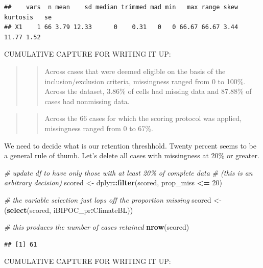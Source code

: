 \documentclass[
  11pt,
]{book}
\newenvironment{Shaded}{\begin{snugshade}}{\end{snugshade}}
\newcommand{\CommentTok}[1]{\textcolor[rgb]{0.37,0.37,0.37}{\textit{#1}}}
\newcommand{\DecValTok}[1]{\textcolor[rgb]{0.06,0.06,0.06}{#1}}
\newcommand{\FunctionTok}[1]{\textcolor[rgb]{0.27,0.27,0.27}{\textbf{#1}}}
\newcommand{\NormalTok}[1]{#1}
\newcommand{\OtherTok}[1]{\textcolor[rgb]{0.37,0.37,0.37}{#1}}
\newcommand{\SpecialCharTok}[1]{\textcolor[rgb]{0.43,0.43,0.43}{\textbf{#1}}}
\begin{document}
\begin{verbatim}
##    vars  n mean    sd median trimmed mad min   max range skew kurtosis   se
## X1    1 66 3.79 12.33      0    0.31   0   0 66.67 66.67 3.44    11.77 1.52
\end{verbatim}

CUMULATIVE CAPTURE FOR WRITING IT UP:

\begin{quote}
\begin{quote}
Across cases that were deemed eligible on the basis of the inclusion/exclusion criteria, missingness ranged from 0 to 100\%. Across the dataset, 3.86\% of cells had missing data and 87.88\% of cases had nonmissing data.
\end{quote}
\end{quote}

\begin{quote}
\begin{quote}
Across the 66 cases for which the scoring protocol was applied, missingness ranged from 0 to 67\%.
\end{quote}
\end{quote}

We need to decide what is our retention threshhold. Twenty percent seems to be a general rule of thumb. Let's delete all cases with missingness at 20\% or greater.

\begin{Shaded}
\begin{Highlighting}[]
\CommentTok{\# update df to have only those with at least 20\% of complete data}
\CommentTok{\# (this is an arbitrary decision)}
\NormalTok{scored }\OtherTok{\textless{}{-}}\NormalTok{ dplyr}\SpecialCharTok{::}\FunctionTok{filter}\NormalTok{(scored, prop\_miss }\SpecialCharTok{\textless{}=} \DecValTok{20}\NormalTok{)}

\CommentTok{\# the variable selection just lops off the proportion missing}
\NormalTok{scored }\OtherTok{\textless{}{-}}\NormalTok{ (}\FunctionTok{select}\NormalTok{(scored, iBIPOC\_pr}\SpecialCharTok{:}\NormalTok{ClimateBL))}

\CommentTok{\# this produces the number of cases retained}
\FunctionTok{nrow}\NormalTok{(scored)}
\end{Highlighting}
\end{Shaded}

\begin{verbatim}
## [1] 61
\end{verbatim}

CUMULATIVE CAPTURE FOR WRITING IT UP:
\end{document}
